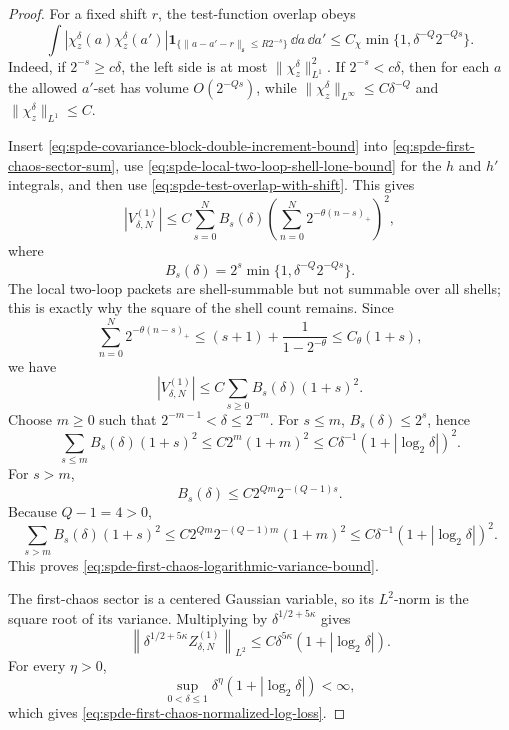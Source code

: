\begin{proof}
For a fixed shift \(r\), the test-function overlap obeys
\begin{equation}
  \int
  |\chi_z^\delta(a)\chi_z^\delta(a')|
  \mathbf 1_{\{\|a-a'-r\|_{\mathfrak s}\leq R2^{-s}\}}
  \,\dd a\,\dd a'
  \leq
  C_\chi\min\{1,\delta^{-Q}2^{-Qs}\}.
  \label{eq:spde-test-overlap-with-shift}
\end{equation}
Indeed, if \(2^{-s}\geq c\delta\), the left side is at most
\(\|\chi_z^\delta\|_{L^1}^2\).  If \(2^{-s}<c\delta\), then for each \(a\)
the allowed \(a'\)-set has volume \(O(2^{-Qs})\), while
\(\|\chi_z^\delta\|_{L^\infty}\leq C\delta^{-Q}\) and
\(\|\chi_z^\delta\|_{L^1}\leq C\).

Insert \eqref{eq:spde-covariance-block-double-increment-bound} into
\eqref{eq:spde-first-chaos-sector-sum}, use
\eqref{eq:spde-local-two-loop-shell-lone-bound} for the \(h\) and \(h'\)
integrals, and then use \eqref{eq:spde-test-overlap-with-shift}.  This gives
\[
  |V_{\delta,N}^{(1)}|
  \leq
  C
  \sum_{s=0}^N
  B_s(\delta)
  \left(
    \sum_{n=0}^N2^{-\theta(n-s)_+}
  \right)^2 ,
\]
where
\[
  B_s(\delta)
  =
  2^s\min\{1,\delta^{-Q}2^{-Qs}\}.
\]
The local two-loop packets are shell-summable but not summable over all
shells; this is exactly why the square of the shell count remains.  Since
\[
  \sum_{n=0}^N2^{-\theta(n-s)_+}
  \leq
  (s+1)+\frac{1}{1-2^{-\theta}}
  \leq
  C_\theta(1+s),
\]
we have
\[
  |V_{\delta,N}^{(1)}|
  \leq
  C
  \sum_{s\geq0}
  B_s(\delta)(1+s)^2 .
\]
Choose \(m\geq0\) such that \(2^{-m-1}<\delta\leq2^{-m}\).  For
\(s\leq m\), \(B_s(\delta)\leq2^s\), hence
\[
  \sum_{s\leq m}B_s(\delta)(1+s)^2
  \leq
  C2^m(1+m)^2
  \leq
  C\delta^{-1}(1+|\log_2\delta|)^2 .
\]
For \(s>m\),
\[
  B_s(\delta)
  \leq
  C2^{Qm}2^{-(Q-1)s}.
\]
Because \(Q-1=4>0\),
\[
  \sum_{s>m}B_s(\delta)(1+s)^2
  \leq
  C2^{Qm}2^{-(Q-1)m}(1+m)^2
  \leq
  C\delta^{-1}(1+|\log_2\delta|)^2 .
\]
This proves \eqref{eq:spde-first-chaos-logarithmic-variance-bound}.

The first-chaos sector is a centered Gaussian variable, so its \(L^2\)-norm
is the square root of its variance.  Multiplying by
\(\delta^{1/2+5\kappa}\) gives
\[
  \left\|
    \delta^{1/2+5\kappa}Z_{\delta,N}^{(1)}
  \right\|_{L^2}
  \leq
  C\delta^{5\kappa}(1+|\log_2\delta|).
\]
For every \(\eta>0\),
\[
  \sup_{0<\delta\leq1}
  \delta^\eta(1+|\log_2\delta|)<\infty ,
\]
which gives \eqref{eq:spde-first-chaos-normalized-log-loss}.
\end{proof}


